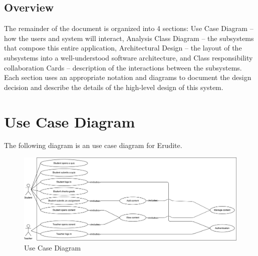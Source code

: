 \documentclass[]{article}
\begin{document}
\subsection{Overview}
\label{sub:overview}
The remainder of the document is organized into 4 sections: Use Case Diagram --
how the users and system will interact, Analysis Class Diagram -- the
subsystems that compose this entire application, Architectural Design -- the
layout of the subsystems into a well-understood software architecture, and
Class responsibility collaboration Cards -- description of the interactions
between the subsystems. Each section uses an appropriate notation and diagrams
to document the design decision and describe the details of the high-level
design of this system.




\newpage

\section{Use Case Diagram}
\label{sec:use_case_diagram}
The following diagram is an use case diagram for Erudite.\\

{
\begin{figure}[h]
  \centering
  \includegraphics[scale=0.40]{A2_Assets/use_case_diagram.pdf}
  \caption{Use Case Diagram}
\end{figure}
}
\end{document}
